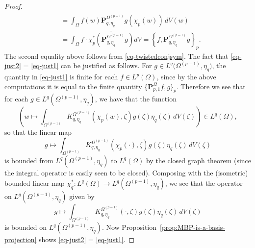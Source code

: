 \documentclass[letterpaper,11pt,reqno]{amsart}
\theoremstyle{plain}
\theoremstyle{definition}
\theoremstyle{remark}
\theoremstyle{remark}
\numberwithin{equation}{section}
\newcommand{\ol}{\overline}
\begin{document}
\begin{proof}
\begin{align}
&= \int_{\Omega} f(w) \ol{\bm{P}^{\Omega^{(p-1)}}_{q,\eta_q}g(\chi_p(w))}\,dV(w)\label{eq-just2} \\
&=\int_\Omega f \cdot \ol{\chi_p^*\left(\bm{P}^{\Omega^{(p-1)}}_{q,\eta_q}g\right)}dV 
= \left\{f, \bm{P}^{\Omega^{(p-1)}}_{q,\eta_q}g\right\}_p.\nonumber
\end{align}
The second equality above follows from \eqref{eq-twistedconjsym}.  The fact that \eqref{eq-just2} = \eqref{eq-just1} can be justified as follows. 
For $g \in L^q\big(\Omega^{(p-1)}, \eta_q\big)$, the quantity in \eqref{eq-just1} is finite for each $f\in L^p(\Omega)$, since by the above computations it is equal to the finite quantity $\{\bm{P}^\Omega_{p,1}f,g \}_p$. 
Therefore we see that for each $g\in L^q(\Omega^{(p-1)}, \eta_q)$, we have that the function
\[
\left( w \longmapsto \int_{\Omega^{(p-1)}} {K^{\Omega^{(p-1)}}_{q,\eta_q}(\chi_p(w), \zeta)} g(\zeta) \eta_q(\zeta) \,dV(\zeta)\right) \in L^q(\Omega),
\]
so that the linear map
\[ 
g \longmapsto \int_{\Omega^{(p-1)}} {K^{\Omega^{(p-1)}}_{q,\eta_q}(\chi_p(\cdot), \zeta)} g(\zeta) \eta_q(\zeta) \, dV(\zeta)
\]
is bounded from $L^q(\Omega^{(p-1)}, \eta_q)$ to $L^q(\Omega)$ by the closed graph theorem (since the integral operator is {easily} seen to be closed). 
Composing with the (isometric) bounded linear map $\chi_q^*:L^q(\Omega)\to L^q(\Omega^{(p-1)}, \eta_q)$, we see that the operator on $L^q(\Omega^{(p-1)}, \eta_q)$ given by 
\[
g \longmapsto \int_{\Omega^{(p-1)}}  {K^{\Omega^{(p-1)}}_{q,\eta_q}(\cdot, \zeta)} g(\zeta) \eta_q(\zeta)\,  dV(\zeta)
\]
is bounded on $L^q(\Omega^{(p-1)}, \eta_q)$. Now Proposition~\ref{prop:MBP-is-a-basis-projection} shows \eqref{eq-just2} = \eqref{eq-just1}.
\end{proof}


\end{document}
